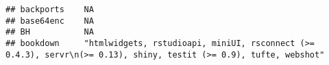 \documentclass[]{book}
\begin{document}
\begin{verbatim}
## backports    NA                                                                                                                                                                                                                                                                                                                                                                                                                                                                                                                                                                                                                                                                                                        
## base64enc    NA                                                                                                                                                                                                                                                                                                                                                                                                                                                                                                                                                                                                                                                                                                        
## BH           NA                                                                                                                                                                                                                                                                                                                                                                                                                                                                                                                                                                                                                                                                                                        
## bookdown     "htmlwidgets, rstudioapi, miniUI, rsconnect (>= 0.4.3), servr\n(>= 0.13), shiny, testit (>= 0.9), tufte, webshot"                                                                                                                                                                                                                                                                                                                                                                                                                                                                                                                                                                                         

\end{verbatim}
\end{document}
